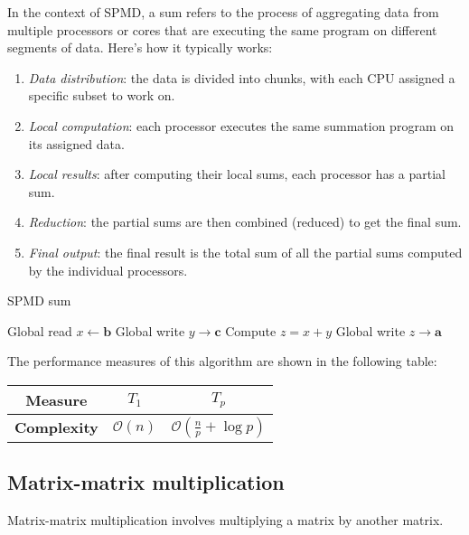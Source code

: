 In the context of SPMD, a sum refers to the process of aggregating data from multiple processors or cores that are executing the same program on different segments of data. 
Here's how it typically works:
\begin{enumerate}
    \item  \textit{Data distribution}: the data is divided into chunks, with each CPU assigned a specific subset to work on.
    \item \textit{Local computation}: each processor executes the same summation program on its assigned data.
    \item \textit{Local results}: after computing their local sums, each processor has a partial sum.
    \item \textit{Reduction}: the partial sums are then combined (reduced) to get the final sum. 
    \item \textit{Final output}: the final result is the total sum of all the partial sums computed by the individual processors.
\end{enumerate}

\begin{algorithm}[H]
    \caption{SPMD sum}
    \begin{algorithmic}[1]
        \State Global read $x \leftarrow \mathbf{b}$ 
        \State Global write $y \rightarrow \mathbf{c}$ 
        \State Compute $z=x+y$ 
        \State Global write $z\rightarrow \mathbf{a}$ 
    \end{algorithmic}
\end{algorithm}
The performance measures of this algorithm are shown in the following table:
\renewcommand*{\arraystretch}{2}
\begin{table}[H]
    \centering
    \begin{tabular}{|c|cc|}
    \hline
    \textbf{Measure} & $T_1$ & $T_p$  \\ \hline
    \textbf{Complexity} & $\mathcal{O}(n)$ & $\mathcal{O}\left(\frac{n}{p}+\log p\right)$ \\ \hline
    \end{tabular}
\end{table}
\renewcommand*{\arraystretch}{1}

\subsection{Matrix-matrix multiplication}
Matrix-matrix multiplication involves multiplying a matrix by another matrix.

